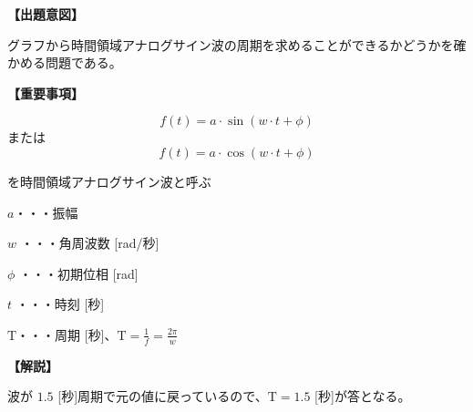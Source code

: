 \noindent \textbf{【出題意図】}

\noindent グラフから時間領域アナログサイン波の周期を求めることができるかどうかを確かめる問題である。

\vspace{1em}
\noindent \textbf{【重要事項】}

\fleqnoff
\[
f(t) = a \cdot \sin( w \cdot t + \phi )
\]
\fleqnon
%
\noindent または
%
\fleqnoff
\[
f(t) = a \cdot \cos( w \cdot t + \phi )
\]
\fleqnon

\medskip
\noindent を時間領域アナログサイン波と呼ぶ

\bigskip
\noindent $a$・・・振幅

\bigskip
\noindent $w$ ・・・角周波数 [rad/秒]

\bigskip
\noindent $\phi$ ・・・初期位相 [rad]

\bigskip
\noindent $t$ ・・・時刻 [秒]

\bigskip
$\textrm{T}$・・・周期 [秒]、$\textrm{T} = \frac{1}{f} = \frac{2\pi}{w}$

\vspace{1em}
\noindent \textbf{【解説】}

\noindent 波が $1.5$ [秒]周期で元の値に戻っているので、$\textrm{T} =1.5$ [秒]が答となる。
